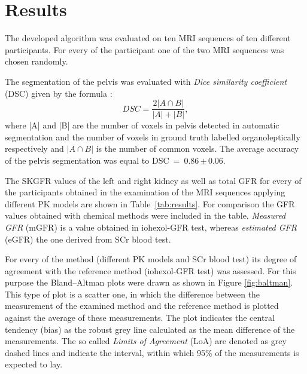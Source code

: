 \section{Results}
The developed algorithm was evaluated on ten MRI sequences of ten different participants. For every of the participant one of the two  MRI sequences was chosen randomly.

The segmentation of the pelvis was evaluated with \textit{Dice similarity coefficient} (DSC) given by the formula \cite{dice1945measures}:
\begin{equation}
	\label{eq:dice}
	DSC = \dfrac{2|A\cap{}B|}{|A|+|B|},
\end{equation}
where |A| and |B| are the number of voxels in pelvis detected  in automatic segmentation and the number of voxels in ground truth labelled organoleptically respectively and $|A\cap{}B|$ is the number of common voxels.
The average accuracy of the pelvis segmentation was equal to DSC~=~0.86\,$\pm$\,0.06.

The SKGFR values of the left and right kidney as well as total GFR for every of the participants obtained in the examination of the MRI sequences applying different PK models are shown in Table~\ref{tab:results}. For comparison the GFR values obtained with chemical methods were included in the table. \textit{Measured GFR} (mGFR) is a value obtained in iohexol-GFR test, whereas \textit{estimated GFR} (eGFR) the one derived from SCr blood test.

For every of the method (different PK models and SCr blood test) its degree of agreement with the reference method  (iohexol-GFR test) was assessed. For this purpose the Bland–Altman plots were drawn \cite{bland1986statistical} as shown in Figure \ref{fig:baltman}. 
This type of plot is a scatter one, in which the difference between the measurement of the examined method and the reference method is plotted against the average of these measurements.
The plot indicates the central tendency (bias) as the robust grey line calculated as the mean difference of the measurements. The so called \textit{Limits of Agreement} (LoA) are denoted as grey dashed lines and indicate the interval, within which 95\% of the measurements is expected to lay.

